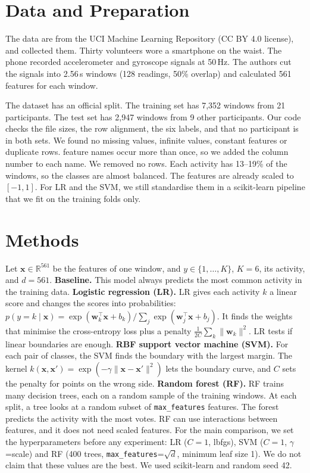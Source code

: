 \documentclass{article}
\begin{document}
\section{Data and Preparation}
The data are from the UCI Machine Learning Repository \citep{uci_har} (CC BY 4.0 license), and \citet{anguita2013} collected them. Thirty volunteers wore a smartphone on the waist. The phone recorded accelerometer and gyroscope signals at 50\,Hz. The authors cut the signals into 2.56\,s windows (128 readings, 50\% overlap) and calculated 561 features for each window.

The dataset has an official split. The training set has 7,352 windows from 21 participants. The test set has 2,947 windows from 9 other participants. Our code checks the file sizes, the row alignment, the six labels, and that no participant is in both sets. We found no missing values, infinite values, constant features or duplicate rows. \Ndupnames{} feature names occur more than once, so we added the column number to each name. We removed no rows. Each activity has 13--19\% of the windows, so the classes are almost balanced. The features are already scaled to $[-1,1]$. For LR and the SVM, we still standardise them in a scikit-learn pipeline that we fit on the training folds only.

\section{Methods}
Let $\mathbf{x}\in\mathbb{R}^{561}$ be the features of one window, and $y\in\{1,\dots,K\}$, $K=6$, its activity, and $d=561$.
\textbf{Baseline.} This model always predicts the most common activity in the training data.
\textbf{Logistic regression (LR).} LR gives each activity $k$ a linear score and changes the scores into probabilities: $p(y=k\mid\mathbf{x})=\exp(\mathbf{w}_k^\top\mathbf{x}+b_k)/\sum_{j}\exp(\mathbf{w}_j^\top\mathbf{x}+b_j)$. It finds the weights that minimise the cross-entropy loss plus a penalty $\tfrac{1}{2C}\sum_k\|\mathbf{w}_k\|^2$. LR tests if linear boundaries are enough.
\textbf{RBF support vector machine (SVM).} For each pair of classes, the SVM finds the boundary with the largest margin. The kernel $k(\mathbf{x},\mathbf{x}')=\exp(-\gamma\|\mathbf{x}-\mathbf{x}'\|^2)$ lets the boundary curve, and $C$ sets the penalty for points on the wrong side.
\textbf{Random forest (RF).} RF trains many decision trees, each on a random sample of the training windows. At each split, a tree looks at a random subset of \texttt{max\_features} features. The forest predicts the activity with the most votes. RF can use interactions between features, and it does not need scaled features. For the main comparison, we set the hyperparameters before any experiment: LR ($C{=}1$, lbfgs), SVM ($C{=}1$, $\gamma$=scale) and RF (400 trees, \texttt{max\_features}=$\sqrt{d}$, minimum leaf size 1). We do not claim that these values are the best. We used scikit-learn \citep{sklearn} and random seed 42.
\end{document}
